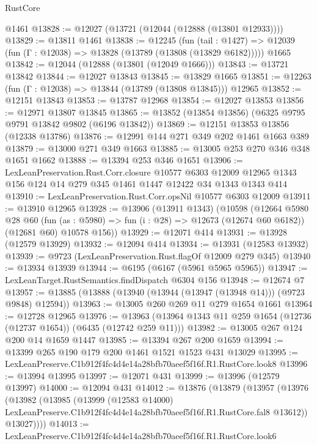 \begin{lexlean}{RustCore}
\begin{coremodule}
    @1461
@13828 := @12027 (@13721 (@12044 (@12888 (@13801 @12933))))
@13829 := @13811 @1461
@13838 := @12245
    (fun (tail : @1427) => @12039 (fun (Γ : @12038) => @13828 (@13789 (@13808 (@13829 @6182)))))
    @1665
@13842 := @12044 (@12888 (@13801 (@12049 @1666)))
@13843 := @13721 @13842
@13844 := @12027 @13843
@13845 := @13829 @1665
@13851 := @12263 (fun (Γ : @12038) => @13844 (@13789 (@13808 @13845))) @12965
@13852 := @12151 @13843
@13853 := @13787 @12968
@13854 := @12027 @13853
@13856 := @12971 @13807 @13845
@13865 := @13852 (@13854 @13856) (@6325 @9795 @9791 @13842 @9802 (@6196 @13842))
@13869 := @12151 @13853 @13856 (@12338 @13786)
@13876 := @12991 @144 @271 @349 @202 @1461 @1663 @389
@13879 := @13000 @271 @349 @1663
@13885 := @13005 @253 @270 @346 @348 @1651 @1662
@13888 := @13394 @253 @346 @1651
@13906 := LexLeanPreservation.Rust.Corr.closure
    @10577
    @6303
    @12009
    @12965
    @1343
    @156
    @124
    @14
    @279
    @345
    @1461
    @1447
    @12422
    @34
    @1343
    @1343
    @414
@13910 := LexLeanPreservation.Rust.Corr.opsNil @10577 @6303 @12009
@13911 := @13910 @12965
@13928 := @13906
    (@13911 @1343)
    (@10598
      (@12664
        @5980
        @28
        @60
        (fun (as : @5980) => fun (i : @28) => @12673 (@12674 @60 @6182))
        (@12681 @60)
        @10578
        @156))
@13929 := @12071 @414
@13931 := @13928 (@12579 @13929)
@13932 := @12094 @414
@13934 := @13931 (@12583 @13932)
@13939 := @9723 (LexLeanPreservation.Rust.flagOf @12009 @279 @345)
@13940 := @13934 @13939
@13944 := @6195 (@6167 (@5961 @5965 @5965))
@13947 := LexLeanTarget.RustSemantics.findDispatch @6304 @156
@13948 := @12674 @7
@13957 := @13885 (@13888 (@13940 (@13944 (@13947 (@13948 @14))) (@9723 @9848) @12594))
@13963 := @13005 @260 @269 @11 @279 @1654 @1661
@13964 := @12728 @12965
@13976 := @13963 (@13964 @1343 @11 @259 @1654 (@12736 (@12737 @1654)) (@6435 (@12742 @259 @11)))
@13982 := @13005 @267 @124 @200 @14 @1659 @1447
@13985 := @13394 @267 @200 @1659
@13994 := @13399 @265 @190 @179 @200 @1461 @1521 @1523 @431 @13029
@13995 := LexLeanPreserve.C1b912f4fc4d4e14a28bfb70aeef5f16f.R1.RustCore.look8
@13996 := @13994 @13995
@13997 := @12071 @431
@13999 := @13996 (@12579 @13997)
@14000 := @12094 @431
@14012 := @13876
    (@13879
      (@13957
        (@13976
          (@13982
            (@13985
              (@13999
                (@12583 @14000)
                LexLeanPreserve.C1b912f4fc4d4e14a28bfb70aeef5f16f.R1.RustCore.fal8
                @13612))
            @13027))))
@14013 := LexLeanPreserve.C1b912f4fc4d4e14a28bfb70aeef5f16f.R1.RustCore.look6

\end{coremodule}
\end{lexlean}
